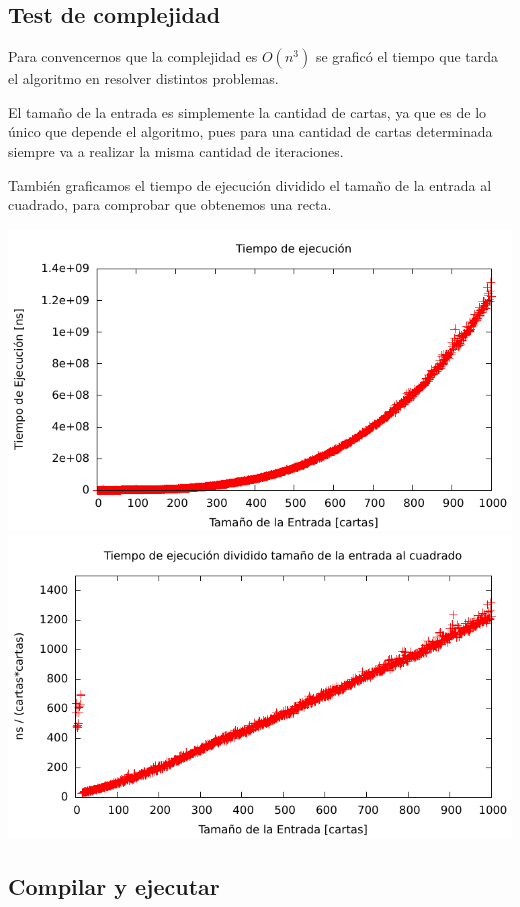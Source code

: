 \subsection{Test de complejidad}
Para convencernos que la complejidad es $O(n^3)$ se graficó el tiempo que tarda el algoritmo en resolver distintos problemas.

El tamaño de la entrada es simplemente la cantidad de cartas, ya que es de lo único que depende el algoritmo, pues para una cantidad de
cartas determinada siempre va a realizar la misma cantidad de iteraciones.

También graficamos el tiempo de ejecución dividido el tamaño de la entrada al cuadrado, para comprobar que obtenemos una recta.

\includegraphics[width=\textwidth]{ej1/cubico.pdf}
\includegraphics[width=\textwidth]{ej1/lineal.pdf}


\subsection{Compilar y ejecutar}


